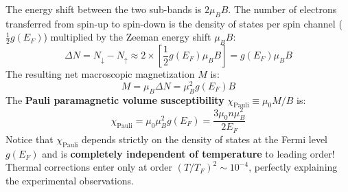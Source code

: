 \documentclass[11pt,a4paper]{article}
\begin{document}
The energy shift between the two sub-bands is $2\mu_B B$. The number of electrons transferred from spin-up to spin-down is the density of states per spin channel ($\frac{1}{2}g(E_F)$) multiplied by the Zeeman energy shift $\mu_B B$:
\begin{equation}
\Delta N = N_\downarrow - N_\uparrow \approx 2 \times \left[ \frac{1}{2}g(E_F) \mu_B B \right] = g(E_F) \mu_B B
\end{equation}
The resulting net macroscopic magnetization $M$ is:
\begin{equation}
M = \mu_B \Delta N = \mu_B^2 g(E_F) B
\end{equation}
The \textbf{Pauli paramagnetic volume susceptibility} $\chi_{\mathrm{Pauli}} \equiv \mu_0 M/B$ is:
\begin{equation}
\boxed{\chi_{\mathrm{Pauli}} = \mu_0 \mu_B^2 g(E_F) = \frac{3\mu_0 n \mu_B^2}{2E_F}}
\label{eq:pauli_susceptibility}
\end{equation}
Notice that $\chi_{\mathrm{Pauli}}$ depends strictly on the density of states at the Fermi level $g(E_F)$ and is \textbf{completely independent of temperature} to leading order! Thermal corrections enter only at order $(T/T_F)^2 \sim 10^{-4}$, perfectly explaining the experimental observations.

\vspace{0.4cm}
\end{document}
